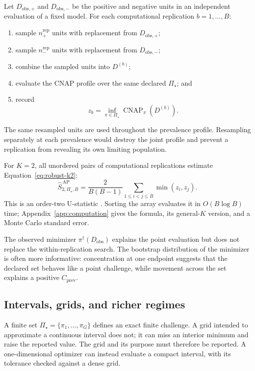 \documentclass[11pt]{article}
\newcommand{\CNAP}{\operatorname{CNAP}}
\newcommand{\PSet}{\Pi_\star}
\theoremstyle{remark}
\begin{document}
Let $D_{\mathrm{obs},+}$ and $D_{\mathrm{obs},-}$ be the positive and negative units in an independent evaluation of a fixed model. For each computational replication $b=1,\ldots,B$:
\begin{enumerate}
\item sample $n_+^{\mathrm{rep}}$ units with replacement from $D_{\mathrm{obs},+}$;
\item sample $n_-^{\mathrm{rep}}$ units with replacement from $D_{\mathrm{obs},-}$;
\item combine the sampled units into $D^{(b)}$;
\item evaluate the CNAP profile over the same declared $\PSet$; and
\item record
\[
z_b
=
\inf_{\pi\in\PSet}\CNAP_\pi(D^{(b)}).
\]
\end{enumerate}
The same resampled units are used throughout the prevalence profile. Resampling separately at each prevalence would destroy the joint profile and prevent a replication from revealing its own limiting population.

For $K=2$, all unordered pairs of computational replications estimate Equation~\eqref{eq:robust-k2}:
\begin{equation}
\widehat S_{2,\PSet,B}^{\,\mathrm{AP}}
=
\frac{2}{B(B-1)}
\sum_{1\leq i<j\leq B}\min(z_i,z_j).
\label{eq:all-pairs}
\end{equation}
This is an order-two U-statistic \cite{hoeffding1948ustat}. Sorting the array evaluates it in $O(B\log B)$ time; Appendix~\ref{app:computation} gives the formula, its general-$K$ version, and a Monte Carlo standard error.

The observed minimizer $\pi^\dagger(D_{\mathrm{obs}})$ explains the point evaluation but does not replace the within-replication search. The bootstrap distribution of the minimizer is often more informative: concentration at one endpoint suggests that the declared set behaves like a point challenge, while movement across the set explains a positive $C_{\mathrm{prev}}$.

\subsection{Intervals, grids, and richer regimes}

A finite set $\PSet=\{\pi_1,\ldots,\pi_G\}$ defines an exact finite challenge. A grid intended to approximate a continuous interval does not; it can miss an interior minimum and raise the reported value. The grid and its purpose must therefore be reported. A one-dimensional optimizer can instead evaluate a compact interval, with its tolerance checked against a dense grid.
\end{document}
